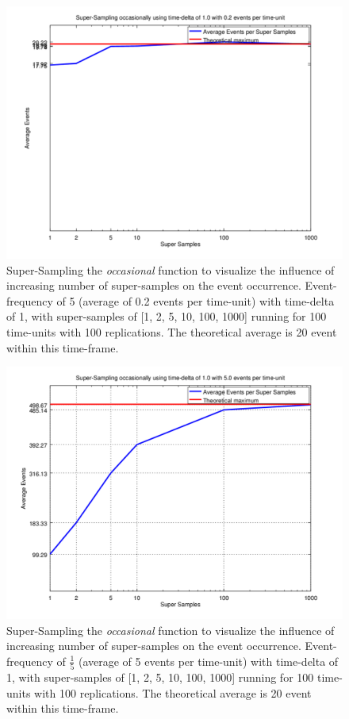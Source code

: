 \begin{figure}
	\centering
	\includegraphics[width=.6\textwidth, angle=0]{./../shared/fig/samplingTest_occasionally_ss_02evts.png}
	\caption{Super-Sampling the \textit{occasional} function to visualize the influence of increasing number of super-samples on the event occurrence. Event-frequency of 5 (average of 0.2 events per time-unit) with time-delta of 1, with super-samples of [1, 2, 5, 10, 100, 1000] running for 100 time-units with 100 replications. The theoretical average is 20 event within this time-frame.}
	\label{fig:sampling_occasionally_ss_02evts}
\end{figure}

\begin{figure}
	\centering
	\includegraphics[width=.6\textwidth, angle=0]{./../shared/fig/samplingTest_occasionally_ss_5evts.png}
	\caption{Super-Sampling the \textit{occasional} function to visualize the influence of increasing number of super-samples on the event occurrence. Event-frequency of $\frac{1}{5}$ (average of 5 events per time-unit) with time-delta of 1, with super-samples of [1, 2, 5, 10, 100, 1000] running for 100 time-units with 100 replications. The theoretical average is 20 event within this time-frame.}
	\label{fig:sampling_occasionally_ss_5evts}
\end{figure}

